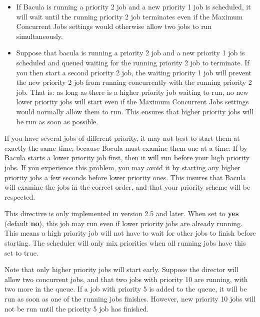\begin{description}
\begin{itemize}
\item If Bacula is running a priority 2 job and a new priority 1 job is
   scheduled, it will wait until the running priority 2 job terminates even
   if the Maximum Concurrent Jobs settings would otherwise allow two jobs
   to run simultaneously.

\item Suppose that bacula is running a priority 2 job and a new priority 1
   job is scheduled and queued waiting for the running priority 2 job to
   terminate.  If you then start a second priority 2 job, the waiting
   priority 1 job will prevent the new priority 2 job from running
   concurrently with the running priority 2 job.  That is: as long as there
   is a higher priority job waiting to run, no new lower priority jobs will
   start even if the Maximum Concurrent Jobs settings would normally allow
   them to run.  This ensures that higher priority jobs will be run as soon
   as possible.
\end{itemize}

If you have several jobs of different priority, it may not best to start
them at exactly the same time, because Bacula must examine them one at a
time.  If by Bacula starts a lower priority job first, then it will run
before your high priority jobs.  If you experience this problem, you may
avoid it by starting any higher priority jobs a few seconds before lower
priority ones.  This insures that Bacula will examine the jobs in the
correct order, and that your priority scheme will be respected.

\label{AllowMixedPriority}
\item [Allow Mixed Priority = \lt{}yes\vb{}no\gt{}]
   This directive is only implemented in version 2.5 and later.  When
   set to {\bf yes} (default {\bf no}), this job may run even if lower
   priority jobs are already running.  This means a high priority job
   will not have to wait for other jobs to finish before starting.
   The scheduler will only mix priorities when all running jobs have
   this set to true.

   Note that only higher priority jobs will start early.  Suppose the
   director will allow two concurrent jobs, and that two jobs with
   priority 10 are running, with two more in the queue.  If a job with
   priority 5 is added to the queue, it will be run as soon as one of
   the running jobs finishes.  However, new priority 10 jobs will not
   be run until the priority 5 job has finished.


\end{description}
